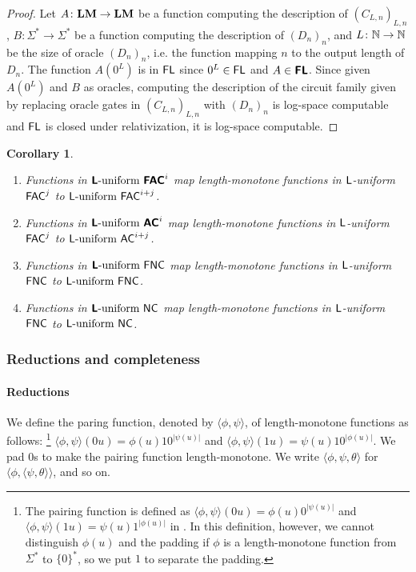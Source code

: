 \documentclass{article}
\newtheorem{corollary}[theorem]{Corollary}
\theoremstyle{definition}
\theoremstyle{remark}
\begin{document}
\begin{proof}
 Let $A \colon \mathbf{LM} \to \mathbf{LM}$ be a function computing the description of $(C_{L,n})_{L,n}$,
 $B \colon \Sigma^* \to \Sigma^*$ be a function computing the description of $(D_n)_n$, and
 $L \colon \mathbb N \to \mathbb N$ be the size of oracle $(D_n)_n$, i.e.
 the function mapping $n$ to the output length of $D_n$.
 The function $A(0^L)$ is in $\mathsf{FL}$ since $0^L \in \mathsf{FL}$ and $A \in \text{\bfseries \sffamily \upshape FL}$.
 Since given $A(0^L)$ and $B$ as oracles,
 computing the description of the circuit family given by replacing oracle
 gates in $(C_{L,n})_{L,n}$ with $(D_n)_n$ is log-space computable
 and $\mathsf{FL}$ is closed under relativization,
 it is log-space computable.
\end{proof}

\begin{corollary}
\mbox{}
\begin{enumerate}
 \item Functions in $\Luniform\ \classFACtwo^i$ 
       map length-monotone functions in $\mathsf{L}$-uniform $\mathsf{FAC}^j$ 
       to $\mathsf{L}\text{-uniform }\mathsf{FAC}^{i+j}$.
 \item Functions in $\Luniform\ \classACtwo^i$ 
       map length-monotone functions in $\mathsf{L}$-uniform $\mathsf{FAC}^j$ 
       to $\mathsf{L}\text{-uniform }\mathsf{AC}^{i+j}$.
 \item Functions in $\Luniform\ \classFNC$
       map length-monotone functions in $\mathsf{L}$-uniform $\mathsf{FNC}$ 
       to $\mathsf{L}\text{-uniform }\mathsf{FNC}$.
 \item Functions in $\Luniform\ \classNC$
       map length-monotone functions in $\mathsf{L}$-uniform $\mathsf{FNC}$ 
       to $\mathsf{L}\text{-uniform }\mathsf{NC}$.
\end{enumerate}
\end{corollary}




\subsubsection{Reductions and completeness}
\paragraph{Reductions}
We define the paring function, denoted by $\langle \phi, \psi \rangle$,
of length-monotone functions as follows:%
\footnote{
The pairing function is defined as
$\langle \phi, \psi \rangle(0u) = \phi(u) 0^{|\psi(u)|}$
and 
$\langle \phi, \psi \rangle(1u) = \psi(u) 1^{|\phi(u)|}$ 
in \cite{kawamura2010complexity}.
In this definition, however, we cannot distinguish $\phi(u)$ and the padding
if $\phi$ is a length-monotone function from $\Sigma^*$ to $\{0\}^*$,
so we put $1$ to separate the padding.
}
$\langle \phi, \psi \rangle(0u) = \phi(u) 10^{|\psi(u)|}$ and 
$\langle \phi, \psi \rangle(1u) = \psi(u) 10^{|\phi(u)|}$.
We pad $0$s to make the pairing function length-monotone.
We write $\langle \phi, \psi, \theta \rangle$ 
for $\langle \phi, \langle \psi, \theta \rangle \rangle$, and so on.
\end{document}
